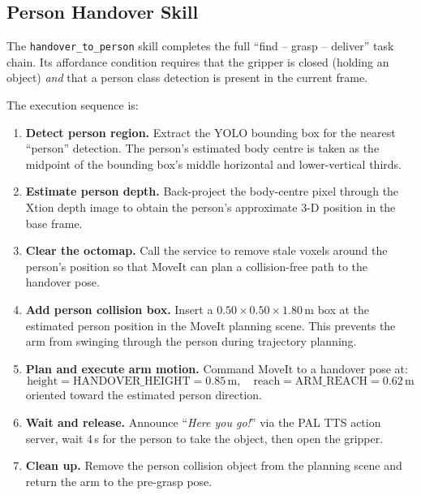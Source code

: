 \subsection{Person Handover Skill}

The \texttt{handover\_to\_person} skill completes the full
``find -- grasp -- deliver'' task chain.
Its affordance condition requires that the gripper is closed (holding an object)
\emph{and} that a person class detection is present in the current frame.

The execution sequence is:

\begin{enumerate}[noitemsep]
  \item \textbf{Detect person region.}
        Extract the YOLO bounding box for the nearest ``person'' detection.
        The person's estimated body centre is taken as the midpoint of the
        bounding box's middle horizontal and lower-vertical thirds.

  \item \textbf{Estimate person depth.}
        Back-project the body-centre pixel through the Xtion depth image
        to obtain the person's approximate 3-D position in the base frame.

  \item \textbf{Clear the octomap.}
        Call the  service to remove stale voxels
        around the person's position so that MoveIt can plan a
        collision-free path to the handover pose.

  \item \textbf{Add person collision box.}
        Insert a $0.50 \times 0.50 \times 1.80$\,m box at the estimated
        person position in the MoveIt planning scene.
        This prevents the arm from swinging through the person during
        trajectory planning.

  \item \textbf{Plan and execute arm motion.}
        Command MoveIt to a handover pose at:
        \[
          \text{height} = \text{HANDOVER\_HEIGHT} = 0.85\,\text{m},
          \quad
          \text{reach} = \text{ARM\_REACH} = 0.62\,\text{m}
        \]
        oriented toward the estimated person direction.

  \item \textbf{Wait and release.}
        Announce ``\emph{Here you go!}'' via the PAL TTS action server,
        wait 4\,s for the person to take the object, then open the gripper.

  \item \textbf{Clean up.}
        Remove the person collision object from the planning scene and
        return the arm to the pre-grasp pose.
\end{enumerate}

